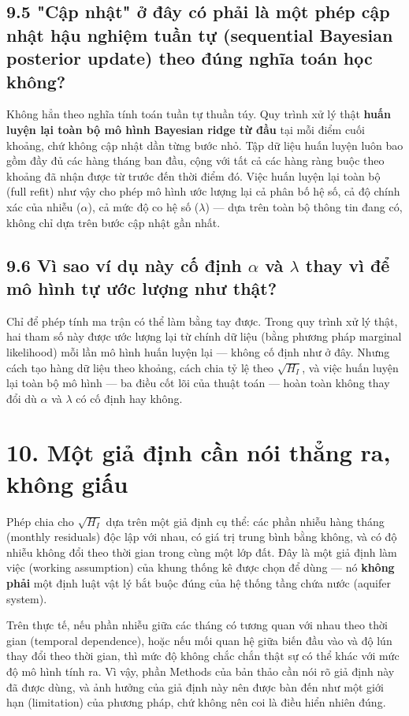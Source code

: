 \documentclass[12pt]{article}
\begin{document}
\subsection{9.5 "Cập nhật" ở đây có phải là một phép cập nhật hậu nghiệm tuần tự (sequential Bayesian posterior update) theo đúng nghĩa toán học không?}

Không hẳn theo nghĩa tính toán tuần tự thuần túy. Quy trình xử lý thật \textbf{huấn luyện lại toàn bộ mô hình Bayesian ridge từ đầu} tại mỗi điểm cuối khoảng, chứ không cập nhật dần từng bước nhỏ. Tập dữ liệu huấn luyện luôn bao gồm đầy đủ các hàng tháng ban đầu, cộng với tất cả các hàng ràng buộc theo khoảng đã nhận được từ trước đến thời điểm đó. Việc huấn luyện lại toàn bộ (full refit) như vậy cho phép mô hình ước lượng lại cả phân bố hệ số, cả độ chính xác của nhiễu ($\alpha$), cả mức độ co hệ số ($\lambda$) — dựa trên toàn bộ thông tin đang có, không chỉ dựa trên bước cập nhật gần nhất.

\subsection{9.6 Vì sao ví dụ này cố định $\alpha$ và $\lambda$ thay vì để mô hình tự ước lượng như thật?}

Chỉ để phép tính ma trận có thể làm bằng tay được. Trong quy trình xử lý thật, hai tham số này được ước lượng lại từ chính dữ liệu (bằng phương pháp marginal likelihood) mỗi lần mô hình huấn luyện lại — không cố định như ở đây. Nhưng cách tạo hàng dữ liệu theo khoảng, cách chia tỷ lệ theo $\sqrt{H_I}$, và việc huấn luyện lại toàn bộ mô hình — ba điều cốt lõi của thuật toán — hoàn toàn không thay đổi dù $\alpha$ và $\lambda$ có cố định hay không.

\section{10. Một giả định cần nói thẳng ra, không giấu}

Phép chia cho $\sqrt{H_I}$ dựa trên một giả định cụ thể: các phần nhiễu hàng tháng (monthly residuals) độc lập với nhau, có giá trị trung bình bằng không, và có độ nhiễu không đổi theo thời gian trong cùng một lớp đất. Đây là một giả định làm việc (working assumption) của khung thống kê được chọn để dùng — nó \textbf{không phải} một định luật vật lý bắt buộc đúng của hệ thống tầng chứa nước (aquifer system).

Trên thực tế, nếu phần nhiễu giữa các tháng có tương quan với nhau theo thời gian (temporal dependence), hoặc nếu mối quan hệ giữa biến đầu vào và độ lún thay đổi theo thời gian, thì mức độ không chắc chắn thật sự có thể khác với mức độ mô hình tính ra. Vì vậy, phần Methods của bản thảo cần nói rõ giả định này đã được dùng, và ảnh hưởng của giả định này nên được bàn đến như một giới hạn (limitation) của phương pháp, chứ không nên coi là điều hiển nhiên đúng.
\end{document}
